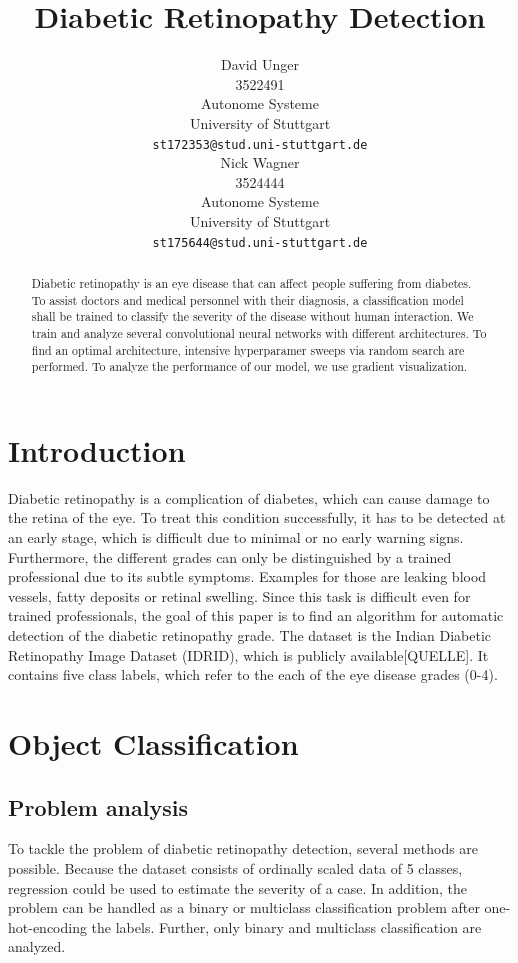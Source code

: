 \documentclass{article}
\title{Diabetic Retinopathy Detection}
\author{
  David Unger\\
  3522491 \\
  Autonome Systeme\\
  University of Stuttgart\\
  \texttt{st172353@stud.uni-stuttgart.de} \\
  \And
  Nick Wagner\\
  3524444 \\
  Autonome Systeme\\
  University of Stuttgart\\
  \texttt{st175644@stud.uni-stuttgart.de} \\
}
\begin{document}
\maketitle

\begin{abstract}
Diabetic retinopathy is an eye disease that can affect people suffering from diabetes. To assist 
doctors and medical personnel with their diagnosis, a classification model shall be trained to classify the severity 
of the disease without human interaction. 
We train and analyze several convolutional neural networks with different architectures. To find an optimal architecture, 
intensive hyperparamer sweeps via random search are performed. To analyze the performance of our model, we use gradient 
visualization.
\end{abstract}

\section{Introduction}
Diabetic retinopathy is a complication of diabetes, which can cause damage to the retina of the eye.
To treat this condition successfully, it has to be detected at an early stage, which is difficult due to minimal or no early warning signs. 
Furthermore, the different grades can only be distinguished by a trained professional due to its subtle symptoms.
Examples for those are leaking blood vessels, fatty deposits or retinal swelling.
Since this task is difficult even for trained professionals, the goal of this paper is to find an algorithm for automatic
detection of the diabetic retinopathy grade. The dataset is the Indian Diabetic Retinopathy Image Dataset (IDRID), which 
is publicly available[QUELLE]. It contains five class labels, which refer to the each of the eye disease grades (0-4).

\section{Object Classification}
\subsection{Problem analysis}

To tackle the problem of diabetic retinopathy detection, several methods are possible. Because the dataset consists of 
ordinally scaled data of 5 classes, regression could be used to estimate the severity of a case. In addition, the problem 
can be handled as a binary or multiclass classification problem after one-hot-encoding the labels.
Further, only binary and multiclass classification are analyzed.
\end{document}
